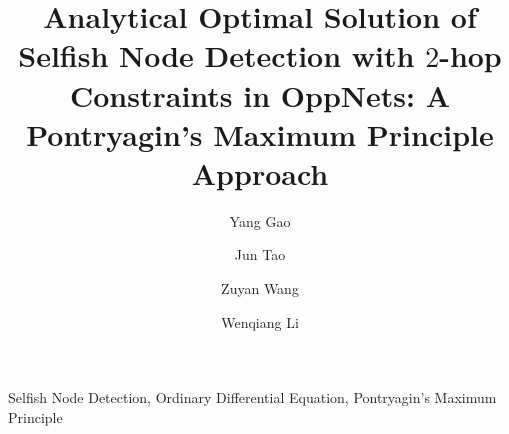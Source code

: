 \documentclass[conference]{IEEEtran}
\begin{document}
\title{Analytical Optimal Solution of Selfish Node Detection with $2$-hop Constraints in OppNets: A Pontryagin's Maximum Principle Approach
}
\author[1]{Yang Gao}
\author[1]{Jun Tao}
\author[1]{Zuyan Wang}
\author[1]{Wenqiang Li}



\maketitle



\begin{IEEEkeywords}
Selfish Node Detection, Ordinary Differential Equation,
Pontryagin's Maximum Principle
\end{IEEEkeywords}











\end{document}

